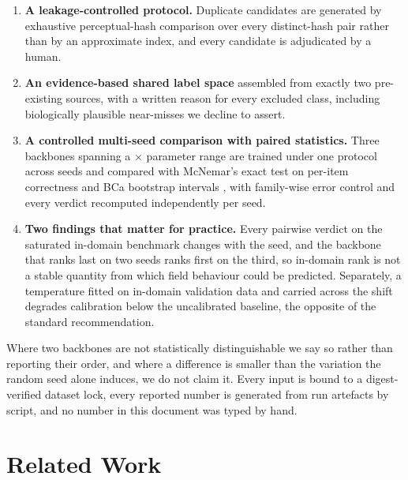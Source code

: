 \documentclass[runningheads]{llncs}
\begin{document}
\begin{enumerate}
\item \textbf{A leakage-controlled protocol.} Duplicate candidates are generated
by exhaustive perceptual-hash comparison over every distinct-hash pair rather
than by an approximate index, and every candidate is adjudicated by a human.

\item \textbf{An evidence-based shared label space} assembled from exactly two
pre-existing sources, with a written reason for every excluded class, including
biologically plausible near-misses we decline to assert.

\item \textbf{A controlled multi-seed comparison with paired statistics.} Three
backbones spanning a \ParamRatio{}$\times$ parameter range are trained under one
protocol across \NSeedsDone{} seeds and compared with McNemar's exact test on
per-item correctness \cite{mcnemar1947,dietterich1998tests} and BCa bootstrap
intervals \cite{efron1987bca}, with family-wise error control \cite{holm1979}
and every verdict recomputed independently per seed.

\item \textbf{Two findings that matter for practice.} Every pairwise verdict on
the saturated in-domain benchmark changes with the seed, and the backbone that
ranks last on two seeds ranks first on the third, so in-domain rank is not a
stable quantity from which field behaviour could be predicted. Separately, a
temperature fitted on in-domain validation data and carried across the shift
degrades calibration below the uncalibrated baseline, the opposite of the
standard recommendation.
\end{enumerate}

Where two backbones are not statistically distinguishable we say so rather than
reporting their order, and where a difference is smaller than the variation the
random seed alone induces, we do not claim it. Every input is bound to a
digest-verified dataset lock, every reported number is generated from run
artefacts by script, and no number in this document was typed by hand.

\section{Related Work}
\end{document}
